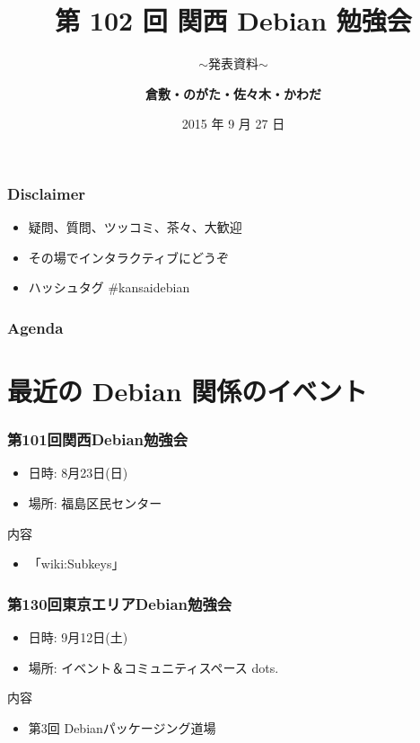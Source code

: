 \documentclass[cjk,dvipdfmx,10pt,compress,%
hyperref={bookmarks=true,bookmarksnumbered=true,bookmarksopen=false,%
colorlinks=false,%
pdftitle={第 102 回 関西 Debian 勉強会},%
pdfauthor={倉敷・のがた・佐々木・かわだ},%
pdfsubject={資料},%
}]{beamer}
\title{第 102 回 関西 Debian 勉強会}
\subtitle{$\sim$発表資料$\sim$}
\author[かわだ てつたろう]{{\large\bf 倉敷・のがた・佐々木・かわだ}}
\institute[Debian JP]{{\normalsize\tt 関西 Debian 勉強会}}
\date{{\small 2015 年 9 月 27 日}}
\begin{document}
\settitleslide
\begin{frame}
\titlepage
\end{frame}
\setdefaultslide

\begin{frame}[fragile]
  \frametitle{Disclaimer}
  \begin{itemize}
  \item 疑問、質問、ツッコミ、茶々、\alert{大歓迎}
  \item その場でインタラクティブにどうぞ
  \item ハッシュタグ \#kansaidebian
  \end{itemize}
\end{frame}

\begin{frame}[fragile]
\frametitle{Agenda}

\tableofcontents

\end{frame}

\section{最近の Debian 関係のイベント}


\begin{frame}[fragile]
  \frametitle{第101回関西Debian勉強会}
  \begin{itemize}
  \item 日時: 8月23日(日)
  \item 場所: 福島区民センター
  \end{itemize}
  \begin{block}{内容}
    \begin{itemize}
    \item 「wiki:Subkeys」
    \end{itemize}
  \end{block}
\end{frame}

\begin{frame}[fragile]
  \frametitle{第130回東京エリアDebian勉強会}
  \begin{itemize}
  \item 日時: 9月12日(土)
  \item 場所: イベント＆コミュニティスペース dots.
  \end{itemize}
  \begin{block}{内容}
    \begin{itemize}
    \item 第3回 Debianパッケージング道場
    \end{itemize}
  \end{block}
\end{frame}
\end{document}
